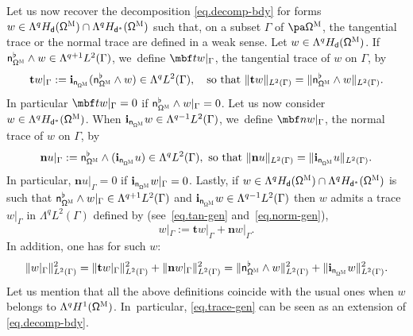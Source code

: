 Let us now recover the decomposition \eqref{eq.decomp-bdy} for forms
$w\in \Lambda^q H_{\mathsf d} (\mathsf \Omega^{\textsc{M}})\cap
\Lambda^q H_{\mathsf d^*} (\mathsf \Omega^{\textsc{M}})$ such that,
on a subset $\Gamma$ of $\pa \mathsf \Omega^{\textsc{M}} $, the
tangential trace or the normal trace are defined in a weak sense.
Let $w\in \Lambda^q H_{\mathsf d} (\mathsf \Omega^{\textsc{M}})$. If~$ \mathsf n_{\mathsf \Omega^{\textsc{M}}}^\flat \wedge w \in
\Lambda^{q+1} L^2 (\Gamma)$, we~define $\mbf tw|_\Gamma$, the tangential trace of $w$ on $\Gamma$, by
\begin{equation}
\label{eq.tan-gen}\mathbf t w|_{\Gamma}:= \mathbf{i}_{\mathsf n_{\mathsf \Omega^{\textsc{M}} }}
(\mathsf n_{\mathsf \Omega^{\textsc{M}} }^{\flat} \wedge w) \in \Lambda^{q} L^2(\Gamma),\quad\text{so that } \|\mathbf t w\|_{ L^2(\Gamma)} = \|\mathsf n_{\mathsf \Omega^{\textsc{M}} }^{\flat} \wedge w\|_{ L^2(\Gamma)}.
\end{equation}
In particular $\mbf tw|_\Gamma=0$ if $ \mathsf n_{\mathsf \Omega^{\textsc{M}}}^\flat \wedge w|_\Gamma=0$.
Let us now consider $w \in \Lambda^q H_{\mathsf d^*} (\mathsf \Omega^{\textsc{M}})$.
When $ \mathbf{i}_{\mathsf n_{\mathsf \Omega^{\textsc{M}}}} w\in
\Lambda^{q-1} L^2 (\Gamma)$, we~define $\mbf nw|_\Gamma$, the
normal trace of $w$ on $\Gamma$, by
\begin{equation}
\label{eq.norm-gen}\mathbf n u|_{\Gamma}:= \mathsf n_{\mathsf \Omega^{\textsc{M}} }^{\flat} \wedge
(\mathbf{i}_{\mathsf n_{\mathsf \Omega^{\textsc{M}} }}u) \in \Lambda^{q} L^2(\Gamma), \text{
so that } \|\mathbf n u\|_{ L^2(\Gamma)}
=\|\mathbf{i}_{\mathsf n_{\mathsf \Omega^{\textsc{M}} }}u\|_{ L^2(\Gamma)}.
\end{equation}
In particular, $\mathbf n u|_{\Gamma} =0$ if $ \mathbf{i}_{\mathsf n_{\mathsf \Omega^{\textsc{M}}}} w|_\Gamma=0$.
Lastly, if $w\in \Lambda^qH_{\mathsf d}(\mathsf \Omega^{\textsc{M}})\cap \Lambda^qH_{\mathsf d^*}(\mathsf \Omega^{\textsc{M}})$ is such that $\mathsf n_{\mathsf \Omega^{\textsc{M}} }^{\flat}\wedge w|_{\Gamma}\in \Lambda^{q+1}L^2(\Gamma)$ and $\mathbf{i}_{\mathsf n_{\mathsf \Omega^{\textsc{M}} }}w\in \Lambda^{q-1}L^2(\Gamma)$ then $w$ admits a trace $w|_{\Gamma}$ in $\Lambda^qL^2(\Gamma)$ defined by (see~\eqref{eq.tan-gen} and~\eqref{eq.norm-gen}),
\begin{equation}
\label{eq.trace-gen}
w|_{\Gamma}:= \mathbf tw|_{\Gamma}+
\mathbf n w|_{\Gamma}.
\end{equation}
In addition, one has for such $w$:
\[
\|w|_{\Gamma}\|^2_{ L^2(\Gamma)} =
\| \mathbf t w|_{\Gamma}\|^2_{ L^2(\Gamma)}
+
\|\mathbf n w|_{\Gamma}\|^2_{ L^2(\Gamma)}
=
\|\mathsf n_{\mathsf \Omega^{\textsc{M}} }^{\flat} \wedge w\|_{ L^2(\Gamma)}^2
+
\|\mathbf{i}_{\mathsf n_{\mathsf \Omega^{\textsc{M}} }}w\|_{ L^2(\Gamma)}^2.
\]
Let us mention that all the above definitions coincide
with the usual ones when $w$ belongs to $\Lambda^q H^1 (\mathsf \Omega^{\textsc{M}})$. In~particular, \eqref{eq.trace-gen} can be seen as an extension of \eqref{eq.decomp-bdy}.

